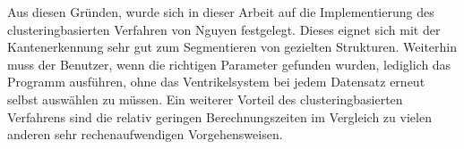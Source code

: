 Aus diesen Gründen, wurde sich in dieser Arbeit auf die Implementierung des clusteringbasierten Verfahren von Nguyen \cite{nguyen2012clustering} festgelegt. Dieses eignet sich mit der Kantenerkennung sehr gut zum Segmentieren von gezielten Strukturen.
Weiterhin muss der Benutzer, wenn die richtigen Parameter gefunden wurden, lediglich das Programm ausführen, ohne das Ventrikelsystem bei jedem Datensatz erneut selbst auswählen zu müssen.
Ein weiterer Vorteil des clusteringbasierten Verfahrens sind die relativ geringen Berechnungszeiten im Vergleich zu vielen anderen sehr rechenaufwendigen Vorgehensweisen. 























































